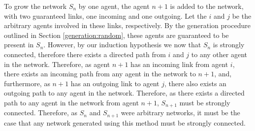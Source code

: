 \documentclass[a4paper, 12pt]{report}
\begin{document}
To grow the network $S_n$ by one agent, the agent $n+1$ is added to the network, with two guaranteed links, one incoming and one outgoing. Let the $i$ and $j$ be the arbitrary agents involved in these links, respectively. By the generation procedure outlined in Section \ref{generation:random}, these agents are guaranteed to be present in $S_n$. However, by our induction hypothesis we now that $S_n$ is strongly connected, therefore there exists a directed path from $i$ and $j$ to any other agent in the network. Therefore, as agent $n+1$ has an incoming link from agent $i$, there exists an incoming path from any agent in the network to $n+1$, and, furthermore, as $n+1$ has an outgoing link to agent $j$, there also exists an outgoing path to any agent in the network. Therefore, as there exists a directed path to any agent in the network from agent $n+1$, $S_{n+1}$ must be strongly connected.\newline
Therefore, as $S_n$ and $S_{n+1}$ were arbitrary networks, it must be the case that any network generated using this method must be strongly connected.\newline
\end{document}
